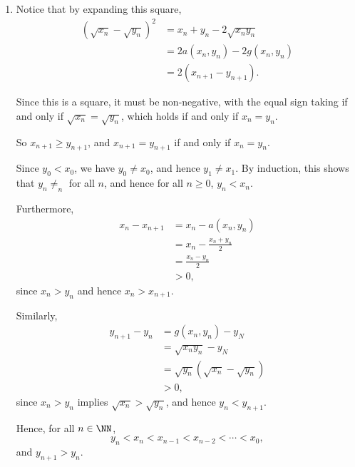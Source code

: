 \Question{\currfilebase}

\begin{enumerate}
    \item Notice that by expanding this square,
          \begin{align*}
              \left(\sqrt{x_n} - \sqrt{y_n}\right)^2 & = x_n + y_n - 2 \sqrt{x_n y_n}  \\
                                                     & = 2 a(x_n, y_n) - 2 g(x_n, y_n) \\
                                                     & = 2 (x_{n + 1} - y_{n + 1}).
          \end{align*}

          Since this is a square, it must be non-negative, with the equal sign taking if and only if \(\sqrt{x_n} = \sqrt{y_n}\), which holds if and only if \(x_n = y_n\).

          So \(x_{n + 1} \geq y_{n + 1}\), and \(x_{n + 1} = y_{n + 1}\) if and only if \(x_n = y_n\).

          Since \(y_0 < x_0\), we have \(y_0 \neq x_0\), and hence \(y_1 \neq x_1\). By induction, this shows that \(y_n \neq _n\) for all \(n\), and hence for all \(n \geq 0\), \(y_n < x_n\).

          Furthermore,
          \begin{align*}
              x_n - x_{n + 1} & = x_n - a(x_n, y_n)         \\
                              & = x_n - \frac{x_n + y_n}{2} \\
                              & = \frac{x_n - y_n}{2}       \\
                              & > 0,
          \end{align*}
          since \(x_n > y_n\) and hence \(x_n > x_{n + 1}\).

          Similarly,
          \begin{align*}
              y_{n + 1} - y_n & = g(x_n, y_n) - y_N                    \\
                              & = \sqrt{x_n y_n} - y_N                 \\
                              & = \sqrt{y_n} (\sqrt{x_n} - \sqrt{y_n}) \\
                              & > 0,
          \end{align*}
          since \(x_n > y_n\) implies \(\sqrt{x_n} > \sqrt{y_n}\), and hence \(y_n < y_{n + 1}\).

          Hence, for all \(n \in \NN\),
          \[
              y_n < x_n < x_{n - 1} < x_{n - 2} < \cdots < x_0,
          \]
          and \(y_{n + 1} > y_n\).


\end{enumerate}
